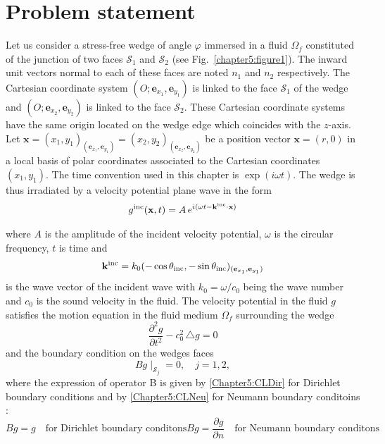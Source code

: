\section{Problem statement}
\label{Chapter5:problem}

Let us consider a stress-free wedge of angle $\varphi$ immersed in a fluid $\Omega_f$ constituted of the junction of two faces $\mathcal{S}_1$ and $\mathcal{S}_2$ (see Fig.~\ref{chapter5:figure1}). The inward unit vectors normal to each of these faces are noted $n_1$ and $n_2$ respectively. The Cartesian coordinate system $(O; \mathbf{e}_{x_1}, \mathbf{e}_{y_1} )$ is linked to the face $\mathcal{S}_1$ of the wedge and $(O;  \mathbf{e}_{x_2}, \mathbf{e}_{y_2} )$ is linked to the face $\mathcal{S}_2$. These Cartesian coordinate systems  have the same origin located on the wedge edge which coincides with the $z$-axis. Let $\mathbf{x} = (x_1,y_1)_{ (\mathbf{e}_{x_1}, \mathbf{e}_{y_1}) } = (x_2,y_2)_{ (\mathbf{e}_{x_2}, \mathbf{e}_{y_2})}$ be a position vector $\mathbf{x} = (r,0)$ in a local basis of polar coordinates associated to the Cartesian coordinates $(x_1,y_1)$. The time convention used in this chapter is $\exp(i\omega t)$. The wedge is thus irradiated by a velocity potential plane wave in the form
\begin{align}
\label{Chapter5:incidence_wave}
g^{\rm inc}(\mathbf{x},t) = A \, e^{i(\omega t - \mathbf{k}^{\rm inc} \cdot \mathbf{x})}
\end{align}

where $A$ is the amplitude of the incident velocity potential, $\omega$ is the circular frequency, $t$ is time and 
\begin{align}
\mathbf{k}^{\rm inc} = k_0 (-\cos \theta_{\rm inc},-\sin \theta_{\rm inc})_{(\mathbf{e}_{x_1}, \mathbf{e}_{y_1})}
\end{align}
is the wave vector of the incident wave with $k_0 = \omega/c_0$ being the wave number and $c_0$ is the sound velocity in the fluid.  The velocity potential in the fluid $g$ satisfies the motion equation in the fluid medium $\Omega_f$ surrounding the wedge 
\begin{equation}
\label{Chapter5:WaveMotion}
\frac{\partial^2 g}{\partial t^2} - c_0^2 \, \triangle g = 0
\end{equation}
and the boundary condition on the wedges faces
\begin{equation}
\label{Chapter5:CL}
Bg\mid_{\mathcal{S}_j} = 0, \quad j=1,2,
\end{equation}
where the expression of operator B is given by \eqref{Chapter5:CLDir} for Dirichlet boundary conditions and by \eqref{Chapter5:CLNeu} for Neumann boundary conditoins :
\begin{subequations}
\begin{equation}
\label{Chapter5:CLDir}
Bg = g \quad \mbox{for Dirichlet boundary conditons}
\end{equation}
\begin{equation}
\label{Chapter5:CLNeu}
Bg = \frac{\partial g}{\partial n} \quad \mbox{for Neumann boundary conditons}
\end{equation}
\end{subequations}

